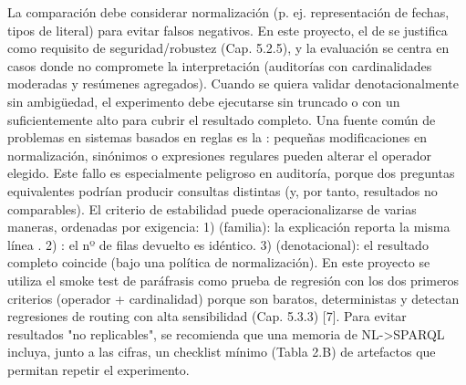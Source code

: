 \markdownRendererUlItem {} La comparación debe considerar normalización (p. ej. representación de fechas, tipos de literal) para evitar falsos negativos.\markdownRendererUlItemEnd 
\markdownRendererUlEndTight \markdownRendererInterblockSeparator
{}En este proyecto, el  de  se justifica como requisito de seguridad/robustez (Cap. 5.2.5), y la evaluación se centra en casos donde  no compromete la interpretación (auditorías con cardinalidades moderadas y resúmenes agregados). Cuando se quiera validar denotacionalmente sin ambigüedad, el experimento debe ejecutarse sin truncado o con un  suficientemente alto para cubrir el resultado completo.\markdownRendererInterblockSeparator
{}\markdownRendererInterblockSeparator
{}Una fuente común de problemas en sistemas basados en reglas es la : pequeñas modificaciones en normalización, sinónimos o expresiones regulares pueden alterar el operador elegido. Este fallo es especialmente peligroso en auditoría, porque dos preguntas equivalentes podrían producir consultas distintas (y, por tanto, resultados no comparables).\markdownRendererInterblockSeparator
{}El criterio de estabilidad puede operacionalizarse de varias maneras, ordenadas por exigencia:\markdownRendererInterblockSeparator
{}1)  (familia): la explicación reporta la misma línea . 2) : el nº de filas devuelto es idéntico. 3)  (denotacional): el resultado completo coincide (bajo una política de normalización).\markdownRendererInterblockSeparator
{}En este proyecto se utiliza el smoke test de paráfrasis como prueba de regresión con los dos primeros criterios (operador + cardinalidad) porque son baratos, deterministas y detectan regresiones de routing con alta sensibilidad (Cap. 5.3.3) [7].\markdownRendererInterblockSeparator
{}\markdownRendererInterblockSeparator
{}Para evitar resultados "no replicables", se recomienda que una memoria de NL->SPARQL incluya, junto a las cifras, un checklist mínimo (Tabla 2.B) de artefactos que permitan repetir el experimento.\markdownRendererInterblockSeparator
